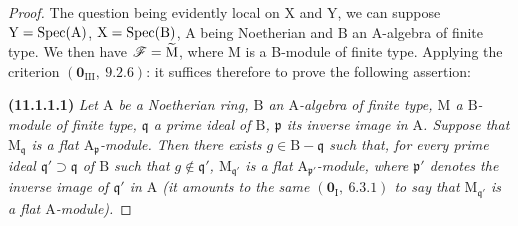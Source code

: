 \begin{proof}
The question being evidently local on $\mathrm{X}$ and $\mathrm{Y}$, we can suppose $\mathrm{Y}=\operatorname{Spec}(\mathrm{A})$, $\mathrm{X}=\operatorname{Spec}(\mathrm{B})$, $\mathrm{A}$ being Noetherian and $\mathrm{B}$ an A-algebra of finite type. We then have $\mathscr{F}=\widetilde{\mathrm{M}}$, where $\mathrm{M}$ is a B-module of finite type. Applying the criterion $(\mathbf{0}_{\mathrm{III}},~9.2.6)$: it suffices therefore to prove the following assertion:

\medskip
{}
\noindent\textbf{(11.1.1.1)}
\emph{Let $\mathrm{A}$ be a Noetherian ring, $\mathrm{B}$ an $\mathrm{A}$-algebra of finite type, $\mathrm{M}$ a $\mathrm{B}$-module of finite type, $\mathfrak{q}$ a prime ideal of $\mathrm{B}$, $\mathfrak{p}$ its inverse image in $\mathrm{A}$. Suppose that $\mathrm{M}_\mathfrak{q}$ is a flat $\mathrm{A}_\mathfrak{p}$-module. Then there exists $g\in\mathrm{B}-\mathfrak{q}$ such that, for every prime ideal $\mathfrak{q}'\supset\mathfrak{q}$ of $\mathrm{B}$ such that $g\notin\mathfrak{q}'$, $\mathrm{M}_{\mathfrak{q}'}$ is a flat $\mathrm{A}_{\mathfrak{p}'}$-module, where $\mathfrak{p}'$ denotes the inverse image of $\mathfrak{q}'$ in $\mathrm{A}$ (it amounts to the same $(\mathbf{0}_\mathrm{I},~6.3.1)$ to say that $\mathrm{M}_{\mathfrak{q}'}$ is a flat $\mathrm{A}$-module).}
\medskip


\end{proof}
